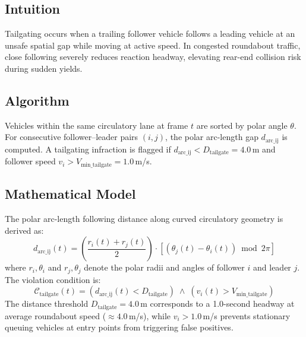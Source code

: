 \documentclass[12pt,a4paper]{report}
\begin{document}
\subsection{Intuition}
Tailgating occurs when a trailing follower vehicle follows a leading vehicle at an unsafe spatial gap while moving at active speed. In congested roundabout traffic, close following severely reduces reaction headway, elevating rear-end collision risk during sudden yields.

\subsection{Algorithm}
Vehicles within the same circulatory lane at frame $t$ are sorted by polar angle $\theta$. For consecutive follower--leader pairs $(i, j)$, the polar arc-length gap $d_{\text{arc\_ij}}$ is computed. A tailgating infraction is flagged if $d_{\text{arc\_ij}} < D_{\text{tailgate}} = 4.0$\,m and follower speed $v_i > V_{\text{min\_tailgate}} = 1.0$\,m/s.

\subsection{Mathematical Model}
The polar arc-length following distance along curved circulatory geometry is derived as:
\begin{equation}
    d_{\text{arc\_ij}}(t) = \left(\frac{r_i(t) + r_j(t)}{2}\right) \cdot \left[(\theta_j(t) - \theta_i(t)) \bmod 2\pi\right]
\end{equation}
where $r_i, \theta_i$ and $r_j, \theta_j$ denote the polar radii and angles of follower $i$ and leader $j$. The violation condition is:
\begin{equation}
    \mathcal{C}_{\text{tailgate}}(t) = \left( d_{\text{arc\_ij}}(t) < D_{\text{tailgate}} \right) \;\land\; \left( v_i(t) > V_{\text{min\_tailgate}} \right)
\end{equation}
The distance threshold $D_{\text{tailgate}} = 4.0$\,m corresponds to a 1.0-second headway at average roundabout speed ($\approx 4.0$\,m/s), while $v_i > 1.0$\,m/s prevents stationary queuing vehicles at entry points from triggering false positives.
\end{document}

